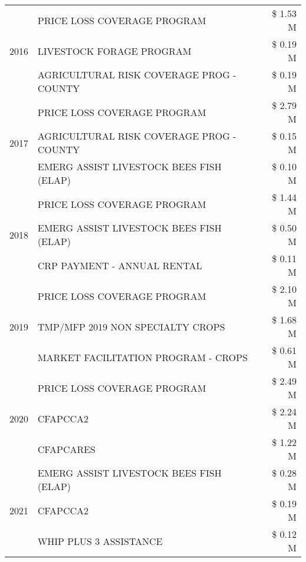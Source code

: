 \begin{tabular}{llr}
\cline{1-3}
\multirow[t]{3}{*}{2016} & PRICE LOSS COVERAGE PROGRAM & \$ 1.53 M \\
 & LIVESTOCK FORAGE PROGRAM & \$ 0.19 M \\
 & AGRICULTURAL RISK COVERAGE PROG - COUNTY & \$ 0.19 M \\
\cline{1-3}
\multirow[t]{3}{*}{2017} & PRICE LOSS COVERAGE PROGRAM & \$ 2.79 M \\
 & AGRICULTURAL RISK COVERAGE PROG - COUNTY & \$ 0.15 M \\
 & EMERG ASSIST LIVESTOCK BEES FISH (ELAP) & \$ 0.10 M \\
\cline{1-3}
\multirow[t]{3}{*}{2018} & PRICE LOSS COVERAGE PROGRAM & \$ 1.44 M \\
 & EMERG ASSIST LIVESTOCK BEES FISH (ELAP) & \$ 0.50 M \\
 & CRP PAYMENT - ANNUAL RENTAL & \$ 0.11 M \\
\cline{1-3}
\multirow[t]{3}{*}{2019} & PRICE LOSS COVERAGE PROGRAM & \$ 2.10 M \\
 & TMP/MFP 2019 NON SPECIALTY CROPS & \$ 1.68 M \\
 & MARKET FACILITATION PROGRAM - CROPS & \$ 0.61 M \\
\cline{1-3}
\multirow[t]{3}{*}{2020} & PRICE LOSS COVERAGE PROGRAM & \$ 2.49 M \\
 & CFAPCCA2 & \$ 2.24 M \\
 & CFAPCARES & \$ 1.22 M \\
\cline{1-3}
\multirow[t]{3}{*}{2021} & EMERG ASSIST LIVESTOCK BEES FISH (ELAP) & \$ 0.28 M \\
 & CFAPCCA2 & \$ 0.19 M \\
 & WHIP PLUS 3 ASSISTANCE & \$ 0.12 M \\
\cline{1-3}
\bottomrule
\end{tabular}
